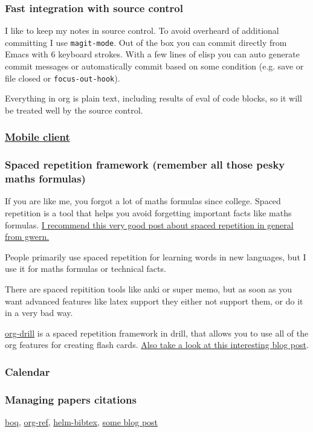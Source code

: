\documentclass[11pt]{article}
\begin{document}
\subsubsection{Fast integration with source control}
\label{sec:orgheadline15}
I like to keep my notes in source control.
To avoid overheard of additional committing I use \texttt{magit-mode}.
Out of the box you can commit directly from Emacs with 6 keyboard strokes.
With a few lines of elisp you can auto generate commit messages or automatically commit based on some condition (e.g. save or file closed or \texttt{focus-out-hook}).

Everything in org is plain text, including results of eval of code blocks, so it will be treated well by the source control.
\subsubsection{\href{https://play.google.com/store/apps/details?id=com.orgzly&hl=en_GB}{Mobile client}}
\label{sec:orgheadline16}
\subsubsection{Spaced repetition framework (remember all those pesky maths formulas)}
\label{sec:orgheadline17}
If you are like me, you forgot a lot of maths formulas since college.
Spaced repetition is a tool that helps you avoid forgetting important facts like maths formulas.
\href{https://www.gwern.net/Spaced\%2520repetition}{I recommend this very good post about spaced repetition in general from gwern.}

People primarily use spaced repetition for learning words in new languages, but I use it for maths formulas or technical facts.

There are spaced repitition tools like anki or super memo, but as soon as you want advanced features like
latex support they either not support them, or do it in a very bad way.

\href{http://orgmode.org/worg/org-contrib/org-drill.html}{org-drill} is a spaced repetition framework in drill, that allows you to use all of the org features for creating flash cards.
\href{http://www.giovannicarmantini.com/2015/07/putting-some-make-up-on-my-org-mode-flashcards}{Also take a look at this interesting blog post}.
\subsubsection{Calendar}
\label{sec:orgheadline18}
\subsubsection{Managing papers citations}
\label{sec:orgheadline19}
\href{https://github.com/kyleam/bog}{boq}, \href{https://github.com/jkitchin/org-ref}{org-ref,} \href{https://github.com/tmalsburg/helm-bibtex}{helm-bibtex,} \href{http://www.mkbehr.com/posts/a-research-workflow-with-zotero-and-org-mode/}{some blog post}
\end{document}
